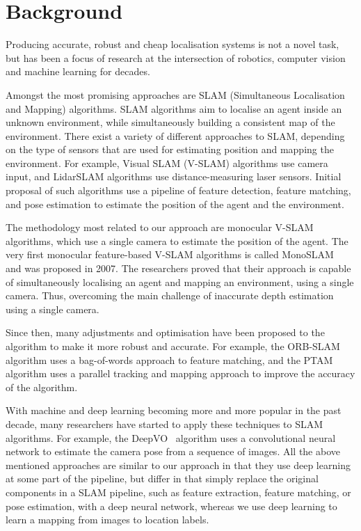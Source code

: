 \documentclass{article}
\begin{document}

  \section{Background} %
  \label{sec:background}


  Producing accurate, robust and cheap localisation systems is not a novel task,
  but has been a focus of research at the intersection of robotics, computer
  vision and machine learning for decades.

  Amongst the most promising approaches are SLAM (Simultaneous Localisation and
  Mapping) algorithms. SLAM algorithms aim to localise an agent inside an
  unknown environment, while simultaneously building a consistent map of the
  environment. There exist a variety of different approaches to SLAM, depending
  on the type of sensors that are used for estimating position and mapping the
  environment. For example, Visual SLAM (V-SLAM) algorithms use camera input,
  and LidarSLAM algorithms use distance-measuring laser sensors.
  Initial proposal of such algorithms use a pipeline of feature detection, 
  feature matching, and pose estimation to estimate the position of the agent
  and the environment. 

  The methodology most related to our approach are monocular V-SLAM algorithms,
  which use a single camera to estimate the position of the agent. The very
  first monocular feature-based V-SLAM algorithms is called
  MonoSLAM~\cite{mono-slam} and was proposed in 2007. The researchers proved
  that their approach is capable of simultaneously localising an agent and
  mapping an environment, using a single camera. Thus, overcoming the main
  challenge of inaccurate depth estimation using a single camera.

  Since then, many adjustments and optimisation have been proposed to the
  algorithm to make it more robust and accurate. For example, the
  ORB-SLAM~\cite{orb-slam} algorithm uses a bag-of-words approach to feature
  matching, and the PTAM~\cite{ptam} algorithm uses a parallel tracking and
  mapping approach to improve the accuracy of the algorithm. 

  With machine and deep learning becoming more and more popular in the past
  decade, many researchers have started to apply these techniques to SLAM
  algorithms. For example, the DeepVO~\cite{deep-vo} algorithm uses a
  convolutional neural network to estimate the camera pose from a sequence of
  images. All the above mentioned approaches are similar to our approach in that
  they use deep learning at some part of the pipeline, but differ in that simply
  replace the original components in a SLAM pipeline, such as feature
  extraction, feature matching, or pose estimation, with a deep neural network,
  whereas we use deep learning to learn a mapping from images to location
  labels.
\end{document}
